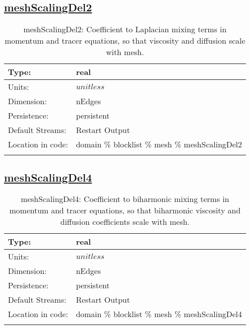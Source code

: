 \subsection[meshScalingDel2]{\hyperref[sec:var_tab_mesh]{meshScalingDel2}}
\label{subsec:var_sec_mesh_meshScalingDel2}
\begin{center}
\begin{longtable}{| p{2.0in} | p{4.0in} |}
        \hline 
        Type: & real \\
        \hline 
        Units: & $unitless$ \\
        \hline 
        Dimension: & nEdges \\
        \hline 
        Persistence: & persistent \\
        \hline 
		 Default Streams: & Restart Output  \\
        \hline 
		 Location in code: & domain \% blocklist \% mesh \% meshScalingDel2 \\
		 \hline 
    \caption{meshScalingDel2: Coefficient to Laplacian mixing terms in momentum and tracer equations, so that viscosity and diffusion scale with mesh.}
\end{longtable}
\end{center}
\subsection[meshScalingDel4]{\hyperref[sec:var_tab_mesh]{meshScalingDel4}}
\label{subsec:var_sec_mesh_meshScalingDel4}
\begin{center}
\begin{longtable}{| p{2.0in} | p{4.0in} |}
        \hline 
        Type: & real \\
        \hline 
        Units: & $unitless$ \\
        \hline 
        Dimension: & nEdges \\
        \hline 
        Persistence: & persistent \\
        \hline 
		 Default Streams: & Restart Output  \\
        \hline 
		 Location in code: & domain \% blocklist \% mesh \% meshScalingDel4 \\
		 \hline 
    \caption{meshScalingDel4: Coefficient to biharmonic mixing terms in momentum and tracer equations, so that biharmonic viscosity and diffusion coefficients scale with mesh.}
\end{longtable}
\end{center}

